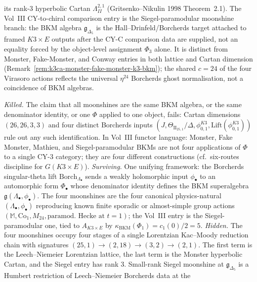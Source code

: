 \begin{theorem}
its rank-$3$ hyperbolic Cartan $\Lambda^{2,1}_{II}$
(Gritsenko--Nikulin 1998 Theorem~2.1). The Vol~III CY-to-chiral
comparison entry is the Siegel-paramodular moonshine branch: the BKM
algebra $\mathfrak g_{\Delta_5}$ is the Hall--Drinfeld/Borcherds target
attached to framed \(K3\times E\) outputs after the CY-C comparison data
are supplied, not an equality forced by the object-level assignment
\(\Phi_3\) alone.  It is distinct from Monster, Fake-Monster, and Conway
entries in both lattice and Cartan dimension
(Remark~\ref{rem:k3ca-monster-fake-monster-k3-bkm}); the shared
$c=24$ of the four Virasoro actions reflects the universal
$\eta^{24}$ Borcherds ghost normalisation, not a coincidence of
BKM algebras.
\end{theorem}

\begin{remark}
\label{rem:k3ca-four-moonshines-killed-surviving-hidden}
\emph{Killed.} The claim that all moonshines are the same BKM
algebra, or the same denominator identity, or one $\Phi$ applied to
one object, fails: Cartan dimensions $(26,26,3,3)$ and four distinct
Borcherds inputs $(J,\Theta_{\mathrm{II}_{25,1}}/\Delta,
\phi^{K3}_{0,1},\mathrm{Lift}(\phi^{K3}_{0,1}))$ rule out any such
identification. In Vol~III functor language: Monster, Fake Monster,
Mathieu, and Siegel-paramodular BKMs are not four applications of
$\Phi$ to a single CY-$3$ category; they are four different
constructions (cf.\ six-routes discipline for $G(K3\times E)$).
\emph{Surviving.} One unifying framework: the Borcherds
singular-theta lift $\mathrm{Borch}_{\Lambda_\bullet}$ sends a
weakly holomorphic input $\phi_\bullet$ to an automorphic form
$\Phi_\bullet$ whose denominator identity defines the BKM
superalgebra $\mathfrak g(\Lambda_\bullet,\phi_\bullet)$. The four
moonshines are the four canonical physics-natural
$(\Lambda_\bullet,\phi_\bullet)$ reproducing known finite sporadic
or almost-simple group actions
$(\mathbb M,\mathrm{Co}_1,M_{24},\text{paramod.\ Hecke at }t=1)$;
the Vol~III entry is the Siegel-paramodular one, tied to
$A_{K3\times E}$ by $\kappa_{\mathrm{BKM}}(\Phi_1)=c_1(0)/2=5$.
\emph{Hidden.} The four moonshines occupy four stages of a single
Lorentzian Kac--Moody reduction chain with signatures
$(25,1)\to(2,18)\to(3,2)\to(2,1)$. The first term is the
Leech--Niemeier Lorentzian lattice, the last term is the Monster
hyperbolic Cartan, and the Siegel entry has rank $3$.
Small-rank Siegel moonshine at $\mathfrak g_{\Delta_5}$ is a
Humbert restriction of Leech--Niemeier Borcherds data at the

\end{remark}
